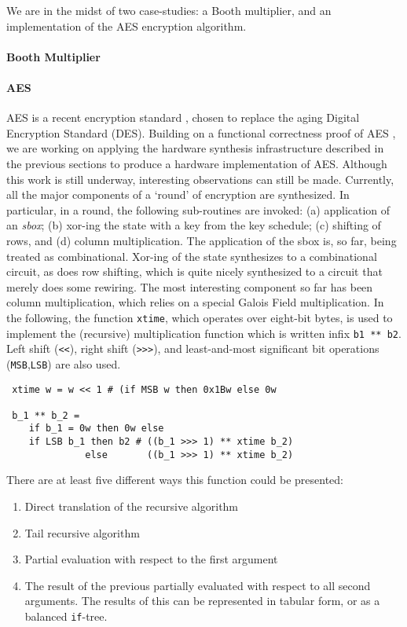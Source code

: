 We are in the midst of two case-studies: a Booth multiplier, and an implementation
of the AES encryption algorithm.

\paragraph{Booth Multiplier}
\paragraph{AES}

AES is a recent encryption standard \cite{AES}, chosen to replace the
aging Digital Encryption Standard (DES). Building on a functional
correctness proof of AES \cite{slind:aes}, we are working on applying
the hardware synthesis infrastructure described in the previous
sections to produce a hardware implementation of AES. Although this
work is still underway, interesting observations can still be
made. Currently, all the major components of a `round' of encryption
are synthesized. In particular, in a round, the following sub-routines
are invoked: (a) application of an \emph{sbox}; (b) xor-ing the state
with a key from the key schedule; (c) shifting of rows, and (d) column
multiplication.  The application of the sbox is, so far, being treated
as combinational.  Xor-ing of the state synthesizes to a combinational
circuit, as does row shifting, which is quite nicely synthesized to a
circuit that merely does some rewiring. The most interesting component
so far has been column multiplication, which relies on a special
Galois Field multiplication.  In the following, the function
\verb+xtime+, which operates over eight-bit bytes, is used to
implement the (recursive) multiplication function which is written
infix \verb+b1 ** b2+. Left shift (\verb+<<+), right shift
(\verb+>>>+), and least-and-most significant bit operations
(\verb+MSB+,\verb+LSB+) are also used.

\begin{verbatim}
 xtime w = w << 1 # (if MSB w then 0x1Bw else 0w

 b_1 ** b_2 =
    if b_1 = 0w then 0w else 
    if LSB b_1 then b2 # ((b_1 >>> 1) ** xtime b_2)
              else       ((b_1 >>> 1) ** xtime b_2)
\end{verbatim}

There are at least five different ways this function could be presented:
\begin{enumerate}
\item Direct translation of the recursive algorithm
\item Tail recursive algorithm
\item Partial evaluation with respect to the first argument
\item The result of the previous partially evaluated with respect to all
second arguments. The results of this can be represented in tabular form,
or as a balanced \verb+if+-tree.
\end{enumerate}
